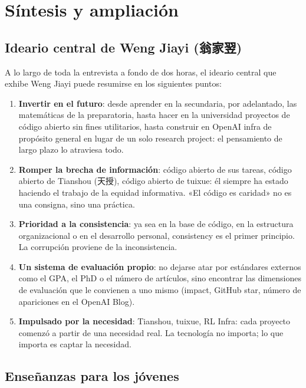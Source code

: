 \section{Síntesis y ampliación}

\subsection{Ideario central de Weng Jiayi (翁家翌)}

A lo largo de toda la entrevista a fondo de dos horas, el ideario central que exhibe Weng Jiayi puede resumirse en los siguientes puntos:

\begin{enumerate}
    \item \textbf{Invertir en el futuro}: desde aprender en la secundaria, por adelantado, las matemáticas de la preparatoria, hasta hacer en la universidad proyectos de código abierto sin fines utilitarios, hasta construir en OpenAI infra de propósito general en lugar de un solo research project: el pensamiento de largo plazo lo atraviesa todo.

    \item \textbf{Romper la brecha de información}: código abierto de sus tareas, código abierto de Tianshou (天授), código abierto de tuixue: él siempre ha estado haciendo el trabajo de la equidad informativa. «El código es caridad» no es una consigna, sino una práctica.

    \item \textbf{Prioridad a la consistencia}: ya sea en la base de código, en la estructura organizacional o en el desarrollo personal, consistency es el primer principio. La corrupción proviene de la inconsistencia.

    \item \textbf{Un sistema de evaluación propio}: no dejarse atar por estándares externos como el GPA, el PhD o el número de artículos, sino encontrar las dimensiones de evaluación que le convienen a uno mismo (impact, GitHub star, número de apariciones en el OpenAI Blog).

    \item \textbf{Impulsado por la necesidad}: Tianshou, tuixue, RL Infra: cada proyecto comenzó a partir de una necesidad real. La tecnología no importa; lo que importa es captar la necesidad.
\end{enumerate}

\subsection{Enseñanzas para los jóvenes}

